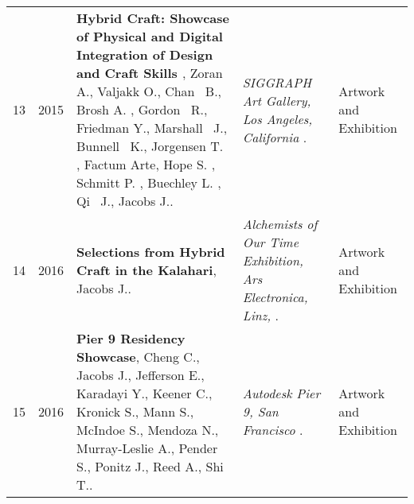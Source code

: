 \begin{longtable}{lcp{7.75cm}>{\raggedright}p{5.25cm}p{1.75cm}}
    13 & 2015 & {\bf Hybrid Craft: Showcase of Physical and Digital Integration of Design and Craft Skills }, Zoran A., Valjakk O., Chan  B., Brosh A. , Gordon  R., Friedman Y., Marshall  J., Bunnell  K., Jorgensen T. , Factum Arte, Hope S. , Schmitt P. , Buechley L. , Qi  J., Jacobs J.. & \emph{ SIGGRAPH Art Gallery, Los Angeles, California  }.  & Artwork and Exhibition\\
    14 & 2016 & {\bf Selections from Hybrid Craft in the Kalahari}, Jacobs J.. & \emph{ Alchemists of Our Time Exhibition, Ars Electronica, Linz,  }.  & Artwork and Exhibition\\
    15 & 2016 & {\bf Pier 9 Residency Showcase}, Cheng C., Jacobs J., Jefferson E., Karadayi Y., Keener C., Kronick S., Mann S., McIndoe S., Mendoza N., Murray-Leslie A., Pender S., Ponitz J., Reed A., Shi T.. & \emph{ Autodesk Pier 9, San Francisco }.  & Artwork and Exhibition\\

\end{longtable}
